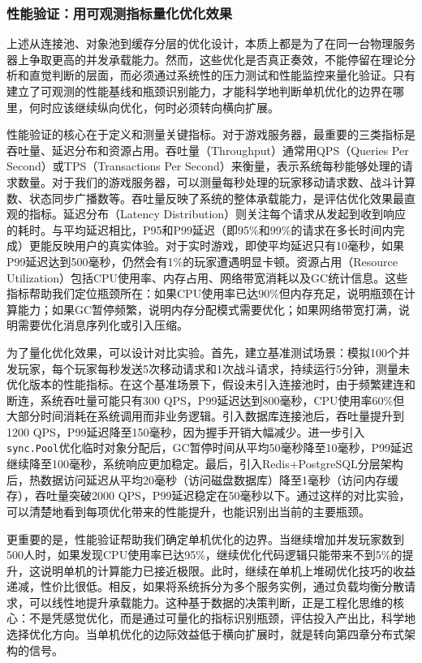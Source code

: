 \subsubsection{性能验证：用可观测指标量化优化效果}

上述从连接池、对象池到缓存分层的优化设计，本质上都是为了在同一台物理服务器上争取更高的并发承载能力。然而，这些优化是否真正奏效，不能停留在理论分析和直觉判断的层面，而必须通过系统性的压力测试和性能监控来量化验证。只有建立了可观测的性能基线和瓶颈识别能力，才能科学地判断单机优化的边界在哪里，何时应该继续纵向优化，何时必须转向横向扩展。

性能验证的核心在于定义和测量关键指标。对于游戏服务器，最重要的三类指标是吞吐量、延迟分布和资源占用。吞吐量（Throughput）通常用QPS（Queries Per Second）或TPS（Transactions Per Second）来衡量，表示系统每秒能够处理的请求数量。对于我们的游戏服务器，可以测量每秒处理的玩家移动请求数、战斗计算数、状态同步广播数等。吞吐量反映了系统的整体承载能力，是评估优化效果最直观的指标。延迟分布（Latency Distribution）则关注每个请求从发起到收到响应的耗时。与平均延迟相比，P95和P99延迟（即95\%和99\%的请求在多长时间内完成）更能反映用户的真实体验。对于实时游戏，即使平均延迟只有10毫秒，如果P99延迟达到500毫秒，仍然会有1\%的玩家遭遇明显卡顿。资源占用（Resource Utilization）包括CPU使用率、内存占用、网络带宽消耗以及GC统计信息。这些指标帮助我们定位瓶颈所在：如果CPU使用率已达90\%但内存充足，说明瓶颈在计算能力；如果GC暂停频繁，说明内存分配模式需要优化；如果网络带宽打满，说明需要优化消息序列化或引入压缩。

为了量化优化效果，可以设计对比实验。首先，建立基准测试场景：模拟100个并发玩家，每个玩家每秒发送5次移动请求和1次战斗请求，持续运行5分钟，测量未优化版本的性能指标。在这个基准场景下，假设未引入连接池时，由于频繁建连和断连，系统吞吐量可能只有300 QPS，P99延迟达到800毫秒，CPU使用率60\%但大部分时间消耗在系统调用而非业务逻辑。引入数据库连接池后，吞吐量提升到1200 QPS，P99延迟降至150毫秒，因为握手开销大幅减少。进一步引入\texttt{sync.Pool}优化临时对象分配后，GC暂停时间从平均50毫秒降至10毫秒，P99延迟继续降至100毫秒，系统响应更加稳定。最后，引入Redis+PostgreSQL分层架构后，热数据访问延迟从平均20毫秒（访问磁盘数据库）降至1毫秒（访问内存缓存），吞吐量突破2000 QPS，P99延迟稳定在50毫秒以下。通过这样的对比实验，可以清楚地看到每项优化带来的性能提升，也能识别出当前的主要瓶颈。

更重要的是，性能验证帮助我们确定单机优化的边界。当继续增加并发玩家数到500人时，如果发现CPU使用率已达95\%，继续优化代码逻辑只能带来不到5\%的提升，这说明单机的计算能力已接近极限。此时，继续在单机上堆砌优化技巧的收益递减，性价比很低。相反，如果将系统拆分为多个服务实例，通过负载均衡分散请求，可以线性地提升承载能力。这种基于数据的决策判断，正是工程化思维的核心：不是凭感觉优化，而是通过可量化的指标识别瓶颈，评估投入产出比，科学地选择优化方向。当单机优化的边际效益低于横向扩展时，就是转向第四章分布式架构的信号。


